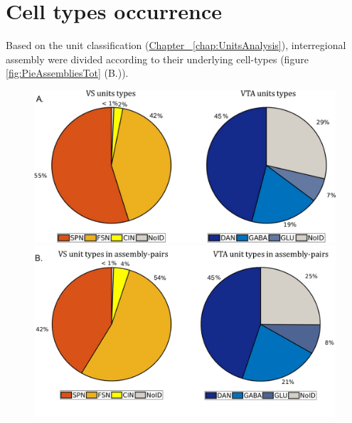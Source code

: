 \section{Cell types occurrence}
\label{sec:AsseTypes}
Based on the unit classification (\hyperref[chap:UnitsAnalysis]{Chapter~ \ref*{chap:UnitsAnalysis}}), interregional assembly were divided according to their underlying cell-types (figure \ref{fig:PieAssembliesTot} (B.)).
\begin{figure}[H]
    \centering
    \includegraphics[scale=0.45]{figures/PieRegions2.pdf}
    
    \vspace{0.5 cm}
    
    \includegraphics[scale=0.45]{figures/PieAsNotAs.pdf}
    
    \vspace{0.5 cm}
    

\end{figure}
